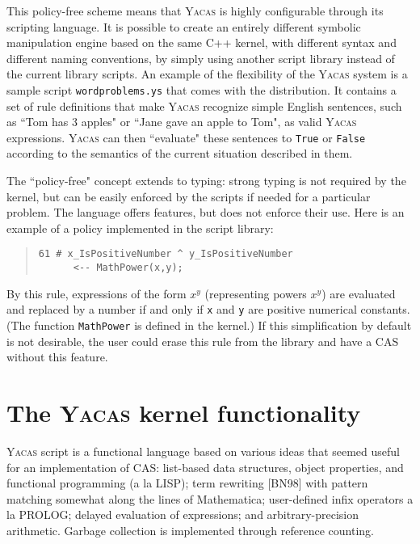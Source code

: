 \documentclass{llncs}
\begin{document}
This policy-free scheme means that \textsc{Yacas} is highly configurable through its
scripting language. It is possible to create an entirely different symbolic
manipulation engine based on the same C++ kernel, with different syntax and
different naming  conventions, by simply using another script library instead
of the current library scripts. An example of the flexibility of the \textsc{Yacas}
system is a sample script \small{\texttt{wordproblems.ys}} that comes with the distribution. It contains a set of rule
definitions that make \textsc{Yacas} recognize simple English sentences, such as ``Tom
has 3 apples" or ``Jane gave an apple to Tom", as valid \textsc{Yacas} expressions. \textsc{Yacas}
can then ``evaluate" these sentences to \small{\texttt{True}} or \small{\texttt{False}} according to
the semantics of the current situation described in them.

The ``policy-free" concept extends to typing: strong typing is not required by
the kernel, but can be easily enforced by the  scripts if needed for a
particular problem. The language offers features, but does not enforce their
use.
Here is an example of a policy implemented in the script library:

\begin{quote}\small\begin{verbatim}
61 # x_IsPositiveNumber ^ y_IsPositiveNumber 
      <-- MathPower(x,y);
\end{verbatim}\end{quote}
By this rule, expressions of the form $x^y$ (representing powers $x ^{y}$) are
evaluated and replaced by a number if and only if \small{\texttt{x}} and \small{\texttt{y}} are positive
numerical constants. (The function \small{\texttt{MathPower}} is  defined in the kernel.) If
this simplification by default is not desirable, the user could erase this rule
from the library
and have a CAS without this feature.

\section{%
The \textsc{Yacas} kernel functionality}
\textsc{Yacas} script is a functional language based on various ideas that seemed useful
for an implementation of CAS: list-based data structures, object properties,
and functional programming (a la LISP); term rewriting [BN98] with
pattern matching somewhat along the lines of Mathematica; user-defined infix
operators a la PROLOG; delayed evaluation of expressions; and
arbitrary-precision arithmetic.
Garbage collection is implemented through reference counting.
\end{document}
